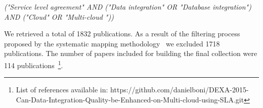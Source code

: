 \begin{center}
\textit{("Service level agreement"  AND ("Data integration" OR "Database
integration") AND ("Cloud" OR "Multi-cloud "))} \\
\end{center}
\medskip


  

We retrieved  a total of 1832 publications. As a result of the filtering process
proposed by the systematic mapping methodology~\cite{SM:Petersen:2008} we excluded 1718 publications.
The number of papers included for building the final collection were 114
publications~\footnote{List of references available in:
https://github.com/danielboni/DEXA-2015-Can-Data-Integration-Quality-be-Enhanced-on-Multi-cloud-using-SLA.git}.
  
